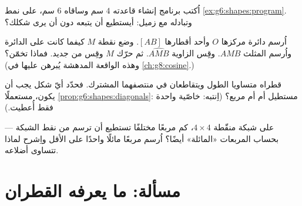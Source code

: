 \begin{exercise}[$\star\star$]\label{exo:g6:shapes:9}
اُكتب برنامج إنشاء  قاعدته
$4$ سم وساقاه $6$ سم، على نمط
\cref{ex:g6:shapes:program}. وتبادله مع زميل: أيستطيع أن يتبعه
دون أن يرى شكلك؟
\end{exercise}

\begin{exercise}[$\star\star$]\label{exo:g6:shapes:10}
اُرسم دائرة مركزها $O$ وأحد أقطارها $[AB]$. وضع نقطة
$M$ كيفما كانت على الدائرة واُرسم المثلث $AMB$. وقِس الزاوية
$\widehat{AMB}$. ثم حرّك $M$ وقِس من جديد. فماذا تخمّن؟
(وهذه الواقعة المدهشة يُبرهن عليها في \cref{ch:g8:cosine}.)
\end{exercise}

\begin{exercise}[$\star\star$]\label{exo:g6:shapes:11}
 قطراه متساويا الطول ويتقاطعان في
منتصفهما المشترك. فحدّد أيّ شكل يجب أن يكون، مستعملًا
\cref{prop:g6:shapes:diagonals}: مستطيل أم  أم مربع؟
(اِنتبه: خاصّية واحدة فقط أُعطيت.)
\end{exercise}

\begin{exercise}[$\star\star\star$]\label{exo:g6:shapes:12}
على شبكة منقّطة $4 \times 4$، كم مربعًا مختلفًا تستطيع أن ترسم
 من نقط الشبكة --- بحساب المربعات «المائلة» أيضًا؟
اُرسم مربعًا مائلًا واحدًا على الأقل واِشرح لماذا تتساوى أضلاعه.
\end{exercise}

\section{مسألة: ما يعرفه القطران}

